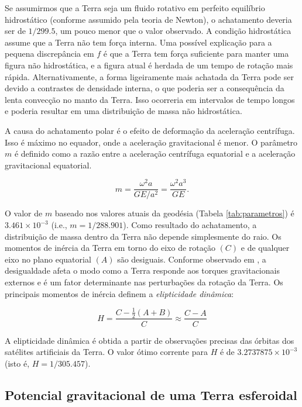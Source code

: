 \documentclass[]{book}
\theoremstyle{definition}
\theoremstyle{definition}
\theoremstyle{definition}
\theoremstyle{remark}
\begin{document}
Se assumirmos que a Terra seja um fluido rotativo em perfeito equilíbrio hidrostático (conforme assumido pela teoria de Newton), o achatamento deveria ser de \(1/299.5\), um pouco menor que o valor observado. A condição hidrostática assume que a Terra não tem força interna. Uma possível explicação para a pequena discrepância em \(f\) é que a Terra tem força suficiente para manter uma figura não hidrostática, e a figura atual é herdada de um tempo de rotação mais rápida. Alternativamente, a forma ligeiramente mais achatada da Terra pode ser devido a contrastes de densidade interna, o que poderia ser a consequência da lenta convecção no manto da Terra. Isso ocorreria em intervalos de tempo longos e poderia resultar em uma distribuição de massa não hidrostática.

A causa do achatamento polar é o efeito de deformação da aceleração centrífuga. Isso é máximo no equador, onde a aceleração gravitacional é menor. O parâmetro \(m\) é definido como a razão entre a aceleração centrífuga equatorial e a aceleração gravitacional equatorial.

\begin{equation}
m=\frac{\omega^{2}a}{GE/a^{2}}=\frac{\omega^{2}a^{3}}{GE}. \label{eq:0218}
\end{equation}

O valor de \(m\) baseado nos valores atuais da geodésia (Tabela \ref{tab:parametros}) é \(3.461\times 10^{-3}\) (i.e., \(m= 1/288.901\)). Como resultado do achatamento, a distribuição de massa dentro da Terra não depende simplesmente do raio. Os momentos de inércia da Terra em torno do eixo de rotação \((C)\) e de qualquer eixo no plano equatorial \((A)\) são desiguais. Conforme observado em \citet{lowrie_2007}, a desigualdade afeta o modo como a Terra responde aos torques gravitacionais externos e é um fator determinante nas perturbações da rotação da Terra. Os principais momentos de inércia definem a \emph{elipticidade dinâmica}:

\begin{equation}
H=\frac{C-\frac{1}{2}(A+B)}{C} \approx \frac{C-A}{C} \label{eq:0219}
\end{equation}

A elipticidade dinâmica é obtida a partir de observações precisas das órbitas dos satélites artificiais da Terra. O valor ótimo corrente para \(H\) é de \(3.2737875\times 10^{-3}\) (isto é, \(H=1/305.457\)).

\hypertarget{potencial-gravitacional-de-uma-terra-esferoidal}{%
\subsection{Potencial gravitacional de uma Terra esferoidal}\label{potencial-gravitacional-de-uma-terra-esferoidal}}
\end{document}
